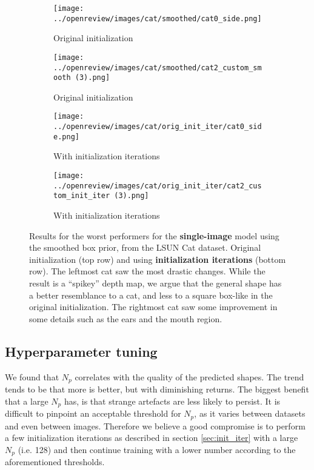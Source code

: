 \begin{figure}[!htb]
    \centering
    \begin{subfigure}{0.4\textwidth}
        \centering
        \texttt{[image: ../openreview/images/cat/smoothed/cat0\_side.png]}
        \caption{Original initialization}
    \end{subfigure}
    \begin{subfigure}{0.4\textwidth}
        \centering
        \texttt{[image: ../openreview/images/cat/smoothed/cat2\_custom\_smooth (3).png]}
        \caption{Original initialization}
    \end{subfigure}
    \begin{subfigure}{0.4\textwidth}
        \centering
        \texttt{[image: ../openreview/images/cat/orig\_init\_iter/cat0\_side.png]}
        \caption{With initialization iterations}
    \end{subfigure}
    \begin{subfigure}{0.4\textwidth}
        \centering
        \texttt{[image: ../openreview/images/cat/orig\_init\_iter/cat2\_custom\_init\_iter (3).png]}
        \caption{With initialization iterations}
    \end{subfigure}
    \caption{Results for the worst performers for the \textbf{single-image} model using the smoothed box prior, from the LSUN Cat dataset. Original initialization (top row) and using \textbf{initialization iterations} (bottom row). The leftmost cat saw the most drastic changes. While the result is a ``spikey'' depth map, we argue that the general shape has a better resemblance to a cat, and less to a square box-like in the original initialization. The rightmost cat saw some improvement in some details such as the ears and the mouth region.}
    \label{fig:init_iter_single}
\end{figure}




\subsection{Hyperparameter tuning}
\label{sec:appendix-hyperparams-tuning}
We found that $N_p$ correlates with the quality of the predicted shapes. The trend tends to be that more is better, but with diminishing returns. The biggest benefit that a large $N_p$ has, is that strange artefacts are less likely to persist. It is difficult to pinpoint an acceptable threshold for $N_p$, as it varies between datasets and even between images.  Therefore we believe a good compromise is to perform a few initialization iterations as described in section \ref{sec:init_iter} with a large $N_p$ (i.e. 128) and then continue training with a lower number according to the aforementioned thresholds.

